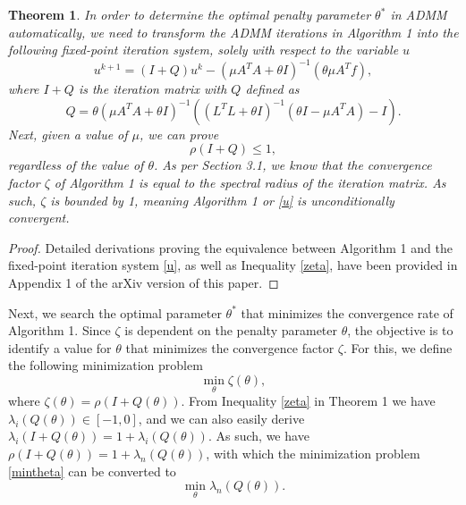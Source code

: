\documentclass[letterpaper]{article} %
\newtheorem{theorem}{Theorem}
\begin{document}
\begin{theorem}
In order to determine the optimal penalty parameter $\theta^*$ in ADMM automatically, we need to transform the ADMM iterations in Algorithm 1 into the following fixed-point iteration system, solely with respect to the variable $u$
\begin{equation}\label{u}
	u^{k+1} = \left(I+ Q\right) u^{k} - \left(\mu A^T A+\theta I\right)^{-1}\left(\theta \mu A^T f\right),
\end{equation}
where $I+Q$ is the iteration matrix with $Q$ defined as
\begin{equation}\label{Q}
	Q = \theta (\mu A^T A+\theta I)^{-1} ( ( {L^T}L +\theta I)^{-1} (\theta I -  \mu A^T A ) - I).
\end{equation}
Next, given a value of $\mu$, we can prove
\begin{equation}\label{zeta}
	\rho\left(I+Q\right)\leq1,
\end{equation}
regardless of the value of $\theta$. As per Section 3.1, we know that the convergence factor $\zeta$ of Algorithm 1 is equal to the spectral radius of the iteration matrix. As such, $\zeta$ is bounded by 1, meaning Algorithm 1 or \eqref{u} is unconditionally convergent.

\end{theorem}

\begin{proof}
 Detailed derivations proving the equivalence between Algorithm 1 and the fixed-point iteration system \eqref{u}, as well as Inequality \eqref{zeta}, have been provided in  Appendix 1 of the arXiv version of this paper.
\end{proof}

Next, we search the optimal parameter $\theta^*$ that minimizes the convergence rate of Algorithm 1. Since $\zeta$ is dependent on the penalty parameter $\theta$, the objective is to identify a value for $\theta$ that minimizes the convergence factor $\zeta$. For this, we define the following minimization problem
\begin{equation} \label{mintheta}
	\min_\theta \zeta\left(\theta\right),
\end{equation}
where $\zeta\left(\theta\right) = \rho \left(I+ Q(\theta)\right)$. From Inequality \eqref{zeta} in Theorem 1 we have $\lambda_i\left(Q(\theta)\right) \in [-1,0]$, and we can also easily derive $\lambda_i \left(I+ Q(\theta)\right) = 1 +  \lambda_i\left(Q(\theta)\right)$. As such, we have $\rho \left(I+ Q(\theta)\right) = 1 +  \lambda_n\left(Q(\theta)\right)$, with which the minimization problem \eqref{mintheta} can be converted to
\begin{equation} \label{mintheta_1}
	\min_\theta \lambda_n\left(Q(\theta)\right).
\end{equation}
\end{document}
